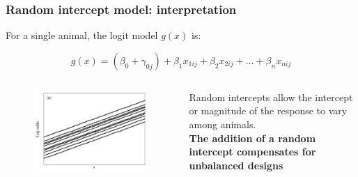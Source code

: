 \documentclass[10pt]{beamer}
\begin{document}
\begin{frame}[fragile]
\frametitle{Random intercept model: interpretation}

For a single animal, the logit model $g(x)$ is:

$$ g(x) = (\beta_0 + \gamma_{0j}) + \beta_1 x_{1ij} + \beta_2 x_{2ij} + ... + \beta_n x_{nij}  $$

\begin{columns}
\begin{figure}
\includegraphics[width=0.8\linewidth]{pictures/randomintercept}
\end{figure}

Random intercepts allow the intercept or magnitude of the response to vary among animals.\\
{\bf The addition of a random intercept compensates for unbalanced designs}
\end{columns}

\end{frame}


\end{document}
